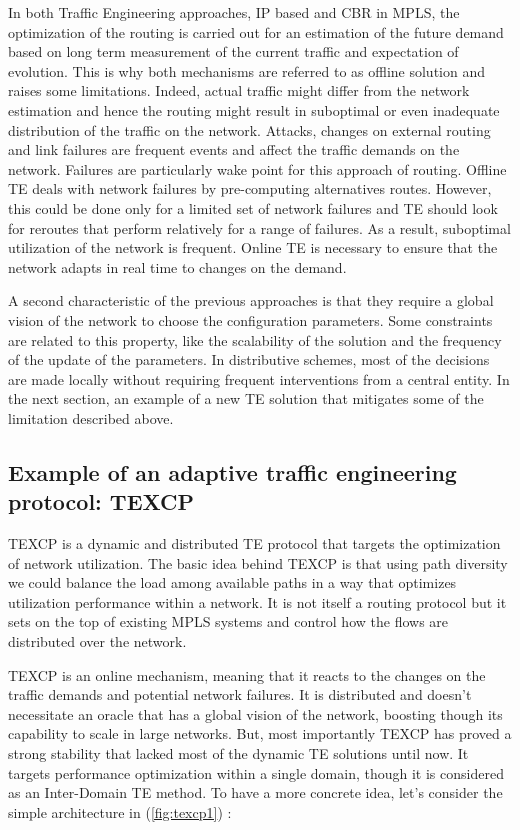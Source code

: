 In both Traffic Engineering approaches, IP based and CBR in MPLS, the optimization of the routing is carried out for an estimation of the future demand based on long term measurement of the current traffic and expectation of evolution.  This is why both mechanisms are referred to as offline solution and raises some limitations. Indeed, actual traffic might differ from the network estimation and hence the routing might result in suboptimal or even inadequate distribution of the traffic on the network. Attacks, changes on external routing and link failures are frequent events and affect the traffic demands on the network. Failures are particularly wake point for this approach of routing. Offline TE deals with network failures by pre-computing alternatives routes. However, this could be done only for a limited set of network failures and TE should look for reroutes that perform relatively for a range of failures. As a result, suboptimal utilization of the network is frequent. Online TE is necessary to ensure that the network adapts in real time to changes on the demand.
	
A second characteristic of the previous approaches is that they require a global vision of the network to choose the configuration parameters. Some constraints are related to this property, like the scalability of the solution and the frequency of the update of the parameters. In distributive schemes, most of the decisions are made locally without requiring frequent interventions from a  central entity. 
In the next section, an example of a new TE solution that mitigates some of the limitation described above.

\subsection{Example of an adaptive traffic engineering protocol: TEXCP }

TEXCP is a dynamic and distributed TE protocol that targets the optimization of network utilization. The basic idea behind TEXCP is that using path diversity we could balance the load among available paths in a way that optimizes utilization performance within a network. It is not itself a routing protocol but it sets on the top of existing MPLS systems and control how the flows are distributed over the network.

TEXCP is an online mechanism, meaning that it reacts to the changes on the traffic demands and potential network failures. It is distributed and doesn't necessitate an oracle that has a global vision of the network, boosting though its capability to scale in large networks. But, most importantly TEXCP has proved a strong stability that lacked most of the dynamic TE solutions until now. 
It targets performance optimization within a single domain, though it is considered as an Inter-Domain TE method. To have a more concrete idea, let's consider the simple architecture in (\ref{fig:texcp1}) :

